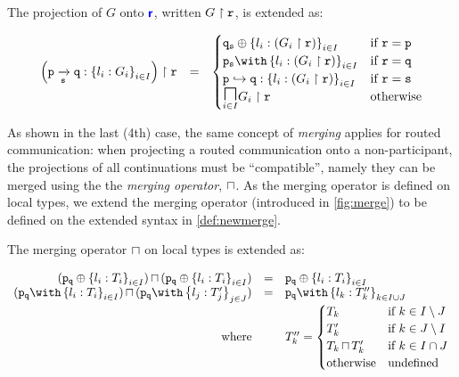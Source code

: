 \begin{definition}[Projection]
The projection of $G$ onto ${\color{blue}\bm{\mathsf{r}}}$,
written ${G} \upharpoonright {\mathtt{r}}$, is extended as:

\doublespacing
\[
\begin{array}{>{\displaystyle}rc>{\displaystyle}l}

\proj{
\left(\groute{p}{q}{s}{l_i: G_i}{i \in I}\right)
}{r} & = & 
\begin{cases}
\tselproxy{q}{s}{l_i: (\proj{G_i}{r})}{i \in I}
	& \text{if} ~ \mrole{r} = \mrole{p} \\
\tbraproxy{p}{s}{l_i: (\proj{G_i}{r})}{i \in I}
	& \text{if} ~ \mrole{r} = \mrole{q} \\
\router{p}{q}{l_i: (\proj{G_i}{r})}{i \in I}
	& \text{if} ~ \mrole{r} = \mrole{s} \\
\underset{i \in I}{\MERGEOP}\proj{G_i}{r}
	& \text{otherwise} \\
\end{cases}
\\

\end{array}
\]
\singlespacing

\label{def:newprojection}
\end{definition}

As shown in the last (4th) case, 
the same concept of \textit{merging}
applies for routed communication:
when projecting a routed communication
onto a non-participant, the projections of
all continuations must be ``compatible'',
namely they can be merged using the
the \textit{merging operator}, $\sqcap$.
As the merging operator is defined on local
types, we extend the merging operator 
(introduced in \cref{fig:merge}) to be defined
on the extended syntax in \cref{def:newmerge}.

\begin{definition}
The merging operator $\sqcap$ on local types
is extended as:

\doublespacing
\[
\begin{array}{rcl}
\tmerge
{(\tselproxy{p}{q}{l_i: T_i}{i \in I})}
{(\tselproxy{p}{q}{l_i: T_i}{i \in I})}
	& = & \tselproxy{p}{q}{l_i: T_i}{i \in I} \\
	
\tmerge
{(\tbraproxy{p}{q}{l_i: T_i}{i \in I})}
{(\tbraproxy{p}{q}{l_j: T'_j}{j \in J})}
	& = & \tbraproxy{p}{q}{l_k: T''_k}{k \in I \cup J} \\
\text{where} & & T''_k = \begin{cases}
T_k & \text{if} ~ k \in I \setminus J \\
T'_k & \text{if} ~ k \in J \setminus I \\
\tmerge{T_k}{T'_k} & \text{if} ~ k \in I \cap J \\
\text{otherwise} & \text{undefined}
\end{cases} \\
\end{array}
\]
\singlespacing

\label{def:newmerge}
\end{definition}


